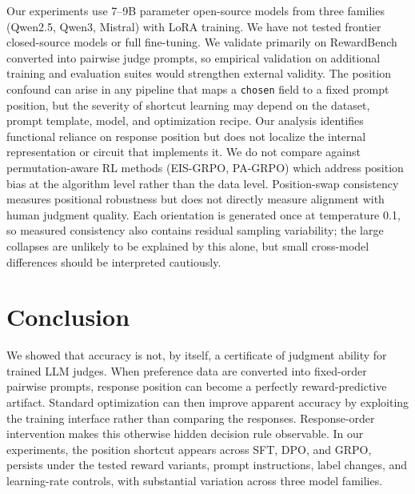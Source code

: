 \documentclass[letterpaper]{article}
\begin{document}
Our experiments use 7--9B parameter open-source models from three families (Qwen2.5, Qwen3, Mistral) with LoRA training. We have not tested frontier closed-source models or full fine-tuning. We validate primarily on RewardBench converted into pairwise judge prompts, so empirical validation on additional training and evaluation suites would strengthen external validity. The position confound can arise in any pipeline that maps a \texttt{chosen} field to a fixed prompt position, but the severity of shortcut learning may depend on the dataset, prompt template, model, and optimization recipe. Our analysis identifies functional reliance on response position but does not localize the internal representation or circuit that implements it. We do not compare against permutation-aware RL methods (EIS-GRPO, PA-GRPO) which address position bias at the algorithm level rather than the data level. Position-swap consistency measures positional robustness but does not directly measure alignment with human judgment quality. Each orientation is generated once at temperature 0.1, so measured consistency also contains residual sampling variability; the large collapses are unlikely to be explained by this alone, but small cross-model differences should be interpreted cautiously.

\vspace{-0.8em}
\section{Conclusion}

We showed that accuracy is not, by itself, a certificate of judgment ability for trained LLM judges. When preference data are converted into fixed-order pairwise prompts, response position can become a perfectly reward-predictive artifact. Standard optimization can then improve apparent accuracy by exploiting the training interface rather than comparing the responses. Response-order intervention makes this otherwise hidden decision rule observable. In our experiments, the position shortcut appears across SFT, DPO, and GRPO, persists under the tested reward variants, prompt instructions, label changes, and learning-rate controls, with substantial variation across three model families.
\end{document}
